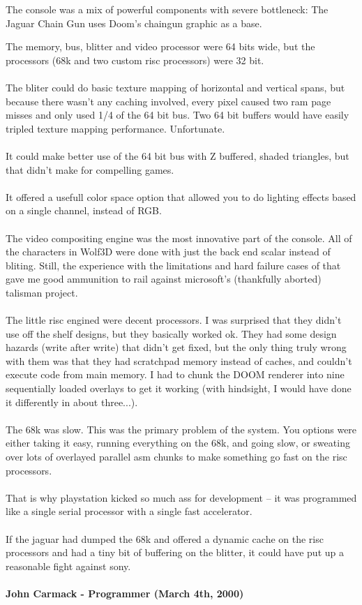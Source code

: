 \documentclass[book.tex]{subfiles}
\begin{document}
The console was a mix of powerful components with severe bottleneck: 
 The Jaguar Chain Gun uses Doom's chaingun graphic as a base.\\
\par
\begin{fancyquotes}
The memory, bus, blitter and video processor were 64 bits wide, but the processors (68k and two custom risc processors) were 32 bit.\\
\\
The bliter could do basic texture mapping of horizontal and vertical spans, but because there wasn't any caching involved, every pixel caused two ram page misses and only used 1/4 of the 64 bit bus. Two 64 bit buffers would have easily tripled texture mapping performance. Unfortunate.\\
\\
It could make better use of the 64 bit bus with Z buffered, shaded triangles, but that didn't make for compelling games.\\
\\
It offered a usefull color space option that allowed you to do lighting effects based on a single channel, instead of RGB.\\
\\
The video compositing engine was the most innovative part of the console. All of the characters in Wolf3D were done with just the back end scalar instead of bliting. Still, the experience with the limitations and hard failure cases of that gave me good ammunition to rail against microsoft's (thankfully aborted) talisman project.\\
\\
The little risc engined were decent processors. I was surprised that they didn't use off the shelf designs, but they basically worked ok. They had some design hazards (write after write) that didn't get fixed, but the only thing truly wrong with them was that they had scratchpad memory instead of caches, and couldn't execute code from main memory. I had to chunk the DOOM renderer into nine sequentially loaded overlays to get it working (with hindsight, I would have done it differently in about three...).\\
\\
The 68k was slow. This was the primary problem of the system. You options were either taking it easy, running everything on the 68k, and going slow, or sweating over lots of overlayed parallel asm chunks to make something go fast on the risc processors.\\
\\
That is why playstation kicked so much ass for development -- it was programmed like a single serial processor with a single fast accelerator.\\
\\
If the jaguar had dumped the 68k and offered a dynamic cache on the risc processors and had a tiny bit of buffering on the blitter, it could have put up a reasonable fight against sony.\\
\\
\textbf{John Carmack - Programmer (March 4th, 2000)}
\end{fancyquotes}
\end{document}
